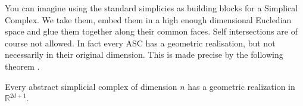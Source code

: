 You can imagine using the standard simplicies as building blocks for a Simplical Complex. We take them, embed them in a high enough dimensional Eucledian space and glue them together along their common faces. Self intersections are of course not allowed. In fact every ASC has a geometric realisation, but not necessarily in their original dimension. This is made precise by the following theorem \cite{comp-topo}.

\begin{thm} Every abstract simplicial complex of dimension $n$ has a geometric realization in $\mathbb{R}^{2d+1}$. \end{thm}












